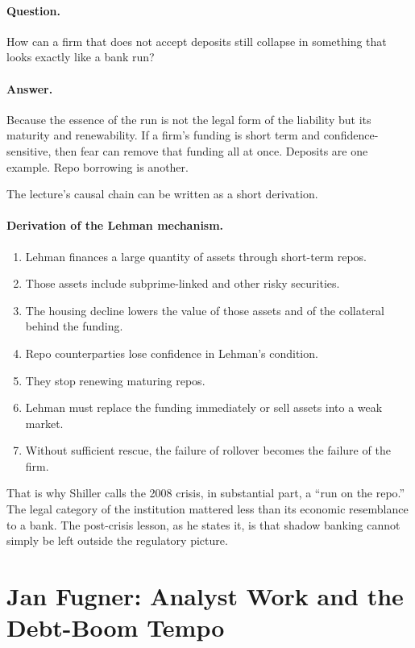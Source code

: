 \paragraph{Question.} How can a firm that does not accept deposits still collapse in something that looks exactly like a bank run?

\paragraph{Answer.} Because the essence of the run is not the legal form of the liability but its maturity and renewability. If a firm's funding is short term and confidence-sensitive, then fear can remove that funding all at once. Deposits are one example. Repo borrowing is another.

The lecture's causal chain can be written as a short derivation.

\paragraph{Derivation of the Lehman mechanism.}
\begin{enumerate}
\item Lehman finances a large quantity of assets through short-term repos.
\item Those assets include subprime-linked and other risky securities.
\item The housing decline lowers the value of those assets and of the collateral behind the funding.
\item Repo counterparties lose confidence in Lehman's condition.
\item They stop renewing maturing repos.
\item Lehman must replace the funding immediately or sell assets into a weak market.
\item Without sufficient rescue, the failure of rollover becomes the failure of the firm.
\end{enumerate}

That is why Shiller calls the 2008 crisis, in substantial part, a ``run on the repo.'' The legal category of the institution mattered less than its economic resemblance to a bank. The post-crisis lesson, as he states it, is that shadow banking cannot simply be left outside the regulatory picture.

\section{Jan Fugner: Analyst Work and the Debt-Boom Tempo}

